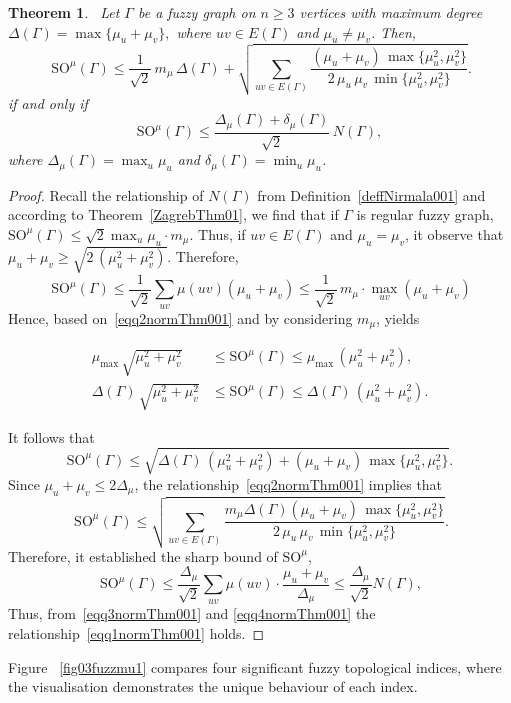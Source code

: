 \documentclass[12pt]{amsart}
\newtheorem{theorem}{Theorem}[section]
\newcommand{\SOG}{\mathrm{SO}^{\mu}}
\begin{document}
\begin{theorem}~\label{normThm001}
Let $\Gamma$ be a fuzzy graph on $n\geqslant 3$ vertices with maximum degree $\Delta(\Gamma)=\max\{\mu_u+\mu_v\},$ where $uv\in E(\Gamma)$ and $\mu_u\neq \mu_v$. Then, 
\begin{equation}~\label{eqq1normThm001}
\SOG(\Gamma) \leqslant \frac{1}{\sqrt{2}}\, m_{\mu}\,\Delta(\Gamma)
+ \sqrt{\sum_{uv\in E(\Gamma)} 
\frac{(\mu_u+\mu_v)\,\max\{\mu_u^2,\mu_v^2\}}
{2\,\mu_u\,\mu_v\,\min\{\mu_u^2,\mu_v^2\}} }.
\end{equation}
if and only if 
\[
\SOG(\Gamma) \leqslant \frac{\Delta_{\mu}(\Gamma)+\delta_{\mu}(\Gamma)}{\sqrt{2}} \, N(\Gamma),
\]
where $\Delta_{\mu}(\Gamma) = \max_u \mu_u$ and $\delta_{\mu}(\Gamma) = \min_u \mu_u$.
\end{theorem}
\begin{proof}
Recall the relationship of $N(\Gamma)$ from Definition~\ref{deffNirmala001} and according to Theorem~\ref{ZagrebThm01}, we find that if $\Gamma$ is regular fuzzy graph, $\SOG(\Gamma) \leqslant \sqrt{2} \max_u \mu_u \cdot m_{\mu}$. Thus, if $uv\in E(\Gamma)$ and $\mu_u=\mu_v$, it observe that $\mu_u+\mu_v\geqslant \sqrt{2\,(\mu_u^2+\mu_v^2)}$. Therefore, 
\begin{equation}~\label{eqq2normThm001}
\SOG(\Gamma)\leqslant \frac{1}{\sqrt{2}} \sum_{uv} \mu(uv) (\mu_u+\mu_v)\leqslant \frac{1}{\sqrt{2}} \, m_{\mu} \cdot \max_{uv} (\mu_u + \mu_v)
\end{equation}
Hence, based on~\eqref{eqq2normThm001} and by considering $m_{\mu}$, yields 

\begin{align*}
\mu_{\max}\,\sqrt{\mu_u^2+\mu_v^2}
&\leqslant \SOG(\Gamma)
\leqslant \mu_{\max}\,(\mu_u^2+\mu_v^2),\\
\Delta(\Gamma)\,\sqrt{\mu_u^2+\mu_v^2}
&\leqslant \SOG(\Gamma)
\leqslant \Delta(\Gamma)\,(\mu_u^2+\mu_v^2).
\end{align*}


It follows that $$\SOG(\Gamma)\leqslant \sqrt{\Delta(\Gamma)\,(\mu_u^2+\mu_v^2)+(\mu_u+\mu_v)\,\max\{\mu_u^2,\mu_v^2\}}.$$ 
Since $\mu_u + \mu_v \leq 2 \Delta_{\mu}$, the relationship~\eqref{eqq2normThm001} implies that 
\begin{equation}~\label{eqq3normThm001}
\SOG(\Gamma)\leqslant \sqrt{\sum_{uv\in E(\Gamma)} 
\frac{m_{\mu}\Delta(\Gamma)(\mu_u+\mu_v)\,\max\{\mu_u^2,\mu_v^2\}}
{2\,\mu_u\,\mu_v\,\min\{\mu_u^2,\mu_v^2\}} }.
\end{equation}
Therefore, it established the sharp bound of $\SOG$, 
\begin{equation}~\label{eqq4normThm001}
\SOG(\Gamma) \leqslant \frac{\Delta_{\mu}}{\sqrt{2}} \sum_{uv} \mu(uv) \cdot \frac{\mu_u + \mu_v}{\Delta_{\mu}} \leqslant \frac{\Delta_{\mu}}{\sqrt{2}} N(\Gamma),
\end{equation}
Thus, from~\eqref{eqq3normThm001} and \eqref{eqq4normThm001} the relationship~\eqref{eqq1normThm001} holds.
\end{proof}
Figure ~\ref{fig03fuzzmu1} compares four significant fuzzy topological indices, where the visualisation demonstrates the unique behaviour of each index. 
\end{document}
